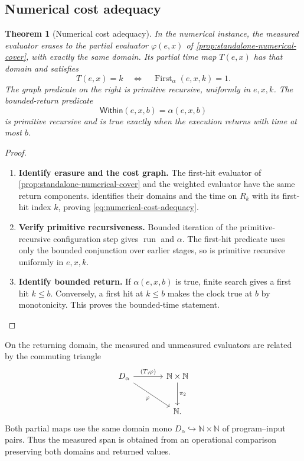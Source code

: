 \documentclass[11pt,a4paper]{article}
\numberwithin{algorithm}{section}
\numberwithin{equation}{section}
\newtheorem{theorem}{Theorem}[section]
\theoremstyle{definition}
\theoremstyle{remark}
\theoremstyle{plain}
\newcommand{\N}{\mathbb N}
\newcommand{\incl}{\hookrightarrow}
\theoremstyle{definition}
\theoremstyle{plain}
\begin{document}
\subsection{Numerical cost adequacy}
\begin{theorem}[Numerical cost adequacy]
\label{thm:numerical-cost-adequacy}
In the numerical instance, the measured evaluator erases to the
partial evaluator $\varphi(e,x)$ of \cref{prop:standalone-numerical-cover}, with exactly the same
domain. Its partial time map $T(e,x)$ has that domain and satisfies
\begin{equation}\label{eq:numerical-cost-adequacy}
 T(e,x)=k\quad\Longleftrightarrow\quad
 \operatorname{First}_\alpha(e,x,k)=1.
\end{equation}
The graph predicate on the right is primitive recursive, uniformly
in $e,x,k$. The bounded-return predicate
\[
 \mathsf{Within}(e,x,b)=\alpha(e,x,b)
\]
is primitive recursive and is true exactly when the execution returns
with time at most $b$.
\end{theorem}
\begin{proof}\leavevmode
\begin{enumerate}[leftmargin=*,align=left]
\item \textbf{Identify erasure and the cost graph.}
The first-hit evaluator of \cref{prop:standalone-numerical-cover}
and the weighted evaluator have the same return components.
 identifies their domains and the
time on $R_k$ with its first-hit index $k$, proving
\eqref{eq:numerical-cost-adequacy}.

\item \textbf{Verify primitive recursiveness.}
Bounded iteration of the primitive-recursive configuration step
gives $\operatorname{run}$ and $\alpha$. The first-hit predicate
uses only the bounded conjunction over earlier stages, so is
primitive recursive uniformly in $e,x,k$.

\item \textbf{Identify bounded return.}
If $\alpha(e,x,b)$ is true, finite search gives a first hit
$k\le b$. Conversely, a first hit at $k\le b$ makes the clock
true at $b$ by monotonicity. This proves the bounded-time statement.
\end{enumerate}
\end{proof}


On the returning domain, the measured and unmeasured evaluators
are related by the commuting triangle
\[
\begin{tikzcd}[column sep=large,row sep=large]
 D_\alpha \arrow[r,"{{(T,\varphi)}}"] \arrow[dr,"{\varphi}"']
   & \N\times\N \arrow[d,"{\pi_2}"]\\
 & \N .
\end{tikzcd}
\]
Both partial maps use the same domain mono
$D_\alpha\incl\N\times\N$ of program--input pairs.
Thus the measured span is obtained from an operational comparison preserving
both domains and returned values.
\end{document}
